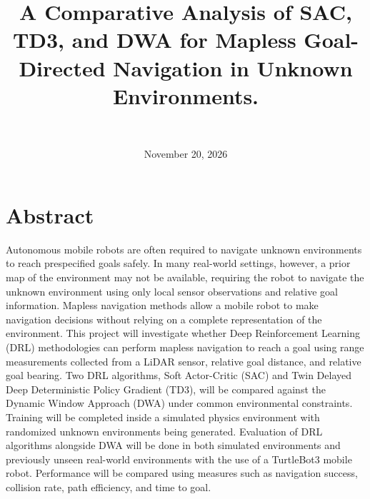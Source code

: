 \documentclass[conference, 11pt]{IEEEtran}
\title{A Comparative Analysis of SAC, TD3, and DWA for Mapless Goal-Directed Navigation in Unknown Environments.}
\author{
\IEEEauthorblockA{CSCI 5551: Introduction to Intelligent Robotic Systems}
    \IEEEauthorblockN{Ketan Inampudi (inamp005@umn.edu), Alec Olson (ols00160@umn.edu)} \\
}
\date{November 20, 2026}
\begin{document}
\maketitle

\section{Abstract}
Autonomous mobile robots are often required to navigate unknown environments to reach prespecified goals safely. 
In many real-world settings, however, a prior map of the environment may not be available, requiring the robot to navigate the unknown environment using only local sensor observations and relative goal information.
Mapless navigation methods allow a mobile robot to make navigation decisions without relying on a complete representation of the environment. 
This project will investigate whether Deep Reinforcement Learning (DRL) methodologies can perform mapless navigation to reach a goal using range measurements collected from a LiDAR sensor, relative goal distance, and relative goal bearing. 
Two DRL algorithms, Soft Actor-Critic (SAC) and Twin Delayed Deep Deterministic Policy Gradient (TD3), will be compared against the Dynamic Window Approach (DWA) under common environmental constraints. 
Training will be completed inside a simulated physics environment with randomized unknown environments being generated. Evaluation of DRL algorithms alongside DWA will be done in both simulated environments and previously unseen real-world environments with the use of a TurtleBot3 mobile robot. 
Performance will be compared using measures such as navigation success, collision rate, path efficiency, and time to goal.
\end{document}
